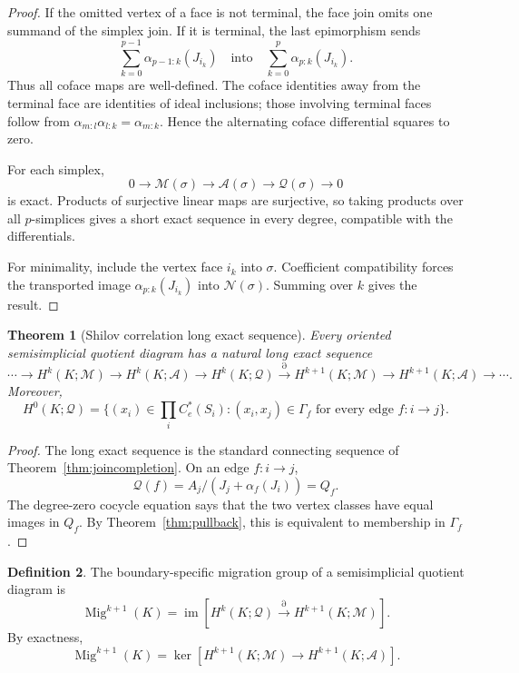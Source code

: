 \documentclass[11pt,a4paper]{amsart}
\theoremstyle{plain}
\newtheorem{theorem}{Theorem}[section]
\theoremstyle{definition}
\newtheorem{definition}[theorem]{Definition}
\newcommand{\Ce}{C_e^*}
\begin{document}
\begin{proof}
If the omitted vertex of a face is not terminal, the face join omits one summand of the simplex
join.  If it is terminal, the last epimorphism sends
\[
 \sum_{k=0}^{p-1}\alpha_{p-1:k}(J_{i_k})
 \quad\text{into}\quad
 \sum_{k=0}^{p}\alpha_{p:k}(J_{i_k}).
\]
Thus all coface maps are well-defined.  The coface identities away from the terminal face are
identities of ideal inclusions; those involving terminal faces follow from
\(\alpha_{m:l}\alpha_{l:k}=\alpha_{m:k}\).  Hence the alternating coface differential squares
to zero.

For each simplex,
\[
 0\to\mathcal M(\sigma)\to\mathcal A(\sigma)\to\mathcal Q(\sigma)\to0
\]
is exact.  Products of surjective linear maps are surjective, so taking products over all
$p$-simplices gives a short exact sequence in every degree, compatible with the differentials.

For minimality, include the vertex face $i_k$ into $\sigma$.  Coefficient compatibility forces
the transported image $\alpha_{p:k}(J_{i_k})$ into $\mathcal N(\sigma)$.  Summing over $k$
gives the result.
\end{proof}

\begin{theorem}[Shilov correlation long exact sequence]\label{thm:les}
Every oriented semisimplicial quotient diagram has a natural long exact sequence
\[
 \cdots\to H^k(K;\mathcal M)\to H^k(K;\mathcal A)
 \to H^k(K;\mathcal Q)\xrightarrow{\partial}
 H^{k+1}(K;\mathcal M)\to H^{k+1}(K;\mathcal A)\to\cdots.
\]
Moreover,
\[
 H^0(K;\mathcal Q)=
 \{(x_i)\in\prod_i\Ce(S_i):(x_i,x_j)\in\Gamma_f
 \text{ for every edge }f:i\to j\}.
\]
\end{theorem}

\begin{proof}
The long exact sequence is the standard connecting sequence of
Theorem~\ref{thm:joincompletion}.  On an edge $f:i\to j$,
\[
 \mathcal Q(f)=A_j/(J_j+\alpha_f(J_i))=Q_f.
\]
The degree-zero cocycle equation says that the two vertex classes have equal images in $Q_f$.
By Theorem~\ref{thm:pullback}, this is equivalent to membership in $\Gamma_f$.
\end{proof}

\begin{definition}\label{def:migration}
The boundary-specific migration group of a semisimplicial quotient diagram is
\[
 \operatorname{Mig}^{k+1}(K)=\operatorname{im}\!\left[
 H^k(K;\mathcal Q)\xrightarrow{\partial}H^{k+1}(K;\mathcal M)\right].
\]
By exactness,
\[
 \operatorname{Mig}^{k+1}(K)=
 \ker\!\left[H^{k+1}(K;\mathcal M)\longrightarrow
 H^{k+1}(K;\mathcal A)\right].
\]
\end{definition}
\end{document}
